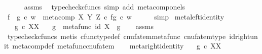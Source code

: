 \begin{isabellebody}
\ \ \ \ \isamarkupfalse%
\ assms\ \isamarkupfalse%
\ {\isacharparenleft}{\kern0pt}typecheck{\isacharunderscore}{\kern0pt}cfuncs{\isacharcomma}{\kern0pt}\ simp\ add{\isacharcolon}{\kern0pt}\ meta{\isacharunderscore}{\kern0pt}comp{\isacharunderscore}{\kern0pt}on{\isacharunderscore}{\kern0pt}els{\isacharparenright}{\kern0pt}\isanewline
\ \ \isamarkupfalse%
\ \isamarkupfalse%
\ {\isachardoublequoteopen}{\isacharparenleft}{\kern0pt}f\ {\isasymbox}\ g{\isacharparenright}{\kern0pt}\ {\isasymcirc}\isactrlsub c\ w\ {\isacharequal}{\kern0pt}\ {\isacharparenleft}{\kern0pt}meta{\isacharunderscore}{\kern0pt}comp\ X\ Y\ Z\ {\isasymcirc}\isactrlsub c\ {\isasymlangle}f{\isacharcomma}{\kern0pt}g{\isasymrangle}{\isacharparenright}{\kern0pt}\ {\isasymcirc}\isactrlsub c\ w{\isachardoublequoteclose}\isanewline
\ \ \ \ \isamarkupfalse%
\ simp\isanewline
{}\isamarkupfalse%
%
\endisatagproof
{\isafoldproof}%
%
\isadelimproof
\isanewline
%
\endisadelimproof
\isanewline
{}\isamarkupfalse%
\ meta{\isacharunderscore}{\kern0pt}left{\isacharunderscore}{\kern0pt}identity{\isacharcolon}{\kern0pt}\isanewline
\ \ \ {\isachardoublequoteopen}g\ {\isasymin}\isactrlsub c\ X\isactrlbsup X\isactrlesup {\isachardoublequoteclose}\isanewline
\ \ \ {\isachardoublequoteopen}g\ {\isasymbox}\ metafunc\ {\isacharparenleft}{\kern0pt}id\ X{\isacharparenright}{\kern0pt}\ {\isacharequal}{\kern0pt}\ g{\isachardoublequoteclose}\isanewline
%
\isadelimproof
\ \ %
\endisadelimproof
%
\isatagproof
{}\isamarkupfalse%
\ assms\ \isamarkupfalse%
\ {\isacharparenleft}{\kern0pt}typecheck{\isacharunderscore}{\kern0pt}cfuncs{\isacharcomma}{\kern0pt}\ metis\ cfunc{\isacharunderscore}{\kern0pt}type{\isacharunderscore}{\kern0pt}def\ cnufatem{\isacharunderscore}{\kern0pt}metafunc\ cnufatem{\isacharunderscore}{\kern0pt}type\ id{\isacharunderscore}{\kern0pt}right{\isacharunderscore}{\kern0pt}unit\ meta{\isacharunderscore}{\kern0pt}comp{}{\isacharunderscore}{\kern0pt}def{}\ metafunc{\isacharunderscore}{\kern0pt}cnufatem{\isacharparenright}{\kern0pt}%
\endisatagproof
{\isafoldproof}%
%
\isadelimproof
\isanewline
%
\endisadelimproof
\ \ \isanewline
{}\isamarkupfalse%
\ meta{\isacharunderscore}{\kern0pt}right{\isacharunderscore}{\kern0pt}identity{\isacharcolon}{\kern0pt}\isanewline
\ \ \ {\isachardoublequoteopen}g\ {\isasymin}\isactrlsub c\ X\isactrlbsup X\isactrlesup {\isachardoublequoteclose}\isanewline

\end{isabellebody}
